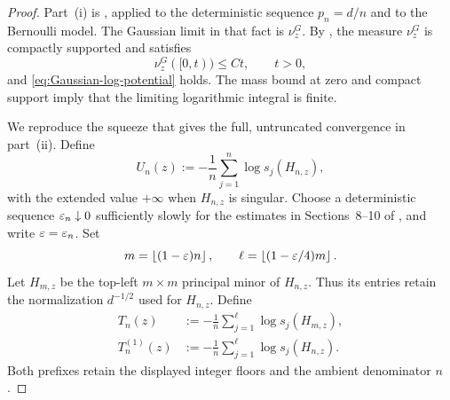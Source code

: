 \begin{proof}
Part~(i) is \cite[Fact~10.2]{SSS25}, applied to the deterministic sequence $p_n=d/n$ and to the Bernoulli model. The Gaussian limit in that fact is $\nu_z^G$. By \cite[Fact~10.1]{SSS25}, the measure $\nu_z^G$ is compactly supported and satisfies
\[
  \nu_z^G([0,t))\le Ct,
  \qquad t>0,
\]
and \eqref{eq:Gaussian-log-potential} holds. The mass bound at zero and compact support imply that the limiting logarithmic integral is finite.

We reproduce the squeeze that gives the full, untruncated convergence in part~(ii). Define
\begin{equation}\label{eq:Bernoulli-Un}
  U_n(z):=-\frac1n\sum_{j=1}^n\log s_j(H_{n,z}),
\end{equation}
with the extended value $+\infty$ when $H_{n,z}$ is singular. Choose a deterministic sequence $\varepsilon_n\downarrow0$ sufficiently slowly for the estimates in Sections~8--10 of \cite{SSS25}, and write $\varepsilon=\varepsilon_n$. Set
\[
  m=\left\lfloor (1-\varepsilon)n\right\rfloor,
  \qquad
  \ell=\left\lfloor (1-\varepsilon/4)m\right\rfloor.
\]
Let $H_{m,z}$ be the top-left $m\times m$ principal minor of $H_{n,z}$. Thus its entries retain the normalization $d^{-1/2}$ used for $H_{n,z}$. Define
\begin{align}
  T_n(z)&:=-\frac1n\sum_{j=1}^{\ell}\log s_j(H_{m,z}),
  \label{eq:SSS-T}\\
  T_n^{(1)}(z)&:=-\frac1n\sum_{j=1}^{\ell}\log s_j(H_{n,z}).
  \label{eq:SSS-T1}
\end{align}
Both prefixes retain the displayed integer floors and the ambient denominator $n$.


\end{proof}
